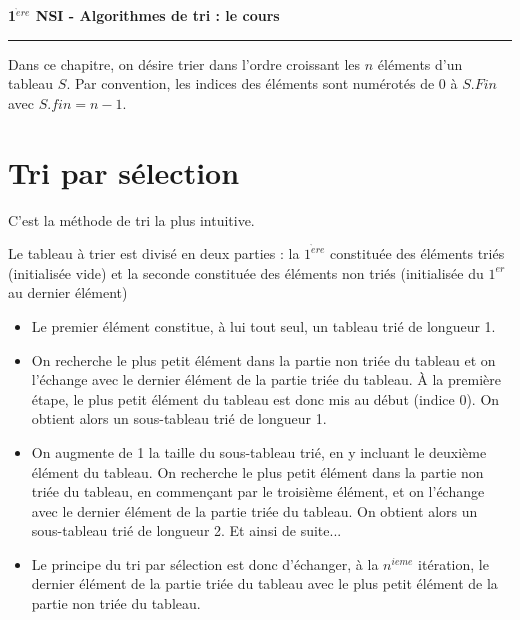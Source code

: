 \documentclass[a4paper,french]{article}
\newcommand{\Titre}[1]{\textbf{{\large{#1}}}}
\begin{document}
\pagestyle{empty}
\parindent 0mm

\begin{center}
\Titre{1$^{\grave{e}re}$ NSI  -  Algorithmes de tri : le cours}
\\[5mm]
\end{center}
\hrule
\vspace*{5mm}

Dans ce chapitre, on désire trier dans l'ordre croissant les $n$ éléments d'un tableau $S$. Par convention, les indices des éléments sont numérotés de $0$ à $S.Fin$ avec $S.fin = n-1$.



\bigskip

\section{Tri par sélection}

C'est la méthode de tri la plus intuitive. 

Le tableau à trier est \og divisé \fg en deux parties : la $1^{\grave{e}re}$ constituée des éléments triés (initialisée vide) et la seconde constituée des éléments non triés (initialisée du $1^{er}$ au dernier élément)
\medskip

\begin{itemize}
\item Le premier élément constitue, à lui tout seul, un tableau trié de longueur 1.

\item On recherche le plus petit élément dans la partie non triée du tableau et on l'échange avec le dernier élément de la partie triée du tableau. À la première étape, le plus petit élément du tableau est donc mis au début (indice $0$). On obtient alors un sous-tableau trié de longueur 1.  

\item On augmente de 1 la taille du sous-tableau trié, en y incluant le deuxième élément du tableau. On recherche le plus petit élément dans la partie non triée du tableau, en commençant par le troisième élément, et on l'échange avec le dernier élément de la partie triée du tableau. On obtient alors un sous-tableau trié de longueur 2. Et ainsi de suite...

\item Le principe du tri par sélection est donc d'échanger, à la $n^{ieme}$ itération, le dernier élément de la partie  triée du tableau avec le plus petit élément de la partie  non triée du tableau.
\end{itemize}
\medskip
\end{document}
